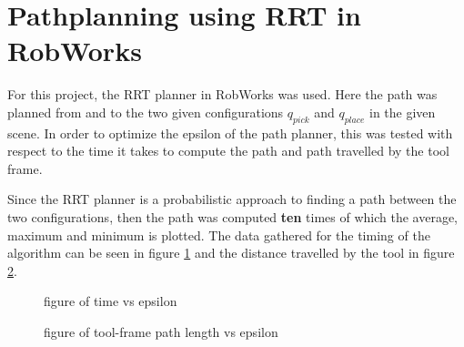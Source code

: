 \documentclass[12pt,a4paper]{article}
\begin{document}
\section{Pathplanning using RRT in RobWorks}
For this project, the RRT planner in RobWorks was used.
Here the path was planned from and to the two given configurations $q_{pick}$ and $q_{place}$ in the given scene.
In order to optimize the epsilon of the path planner, this was tested with respect to the time it takes to compute the path and path travelled by the tool frame.

Since the RRT planner is a probabilistic approach to finding a path between the two configurations, then the path was computed \textbf{ten} times of which the average, maximum and minimum is plotted.
The data gathered for the timing of the algorithm can be seen in figure \ref{fig:timeVSepsilon} and the distance travelled by the tool in figure \ref{fig:distVSepsilon}.


\begin{figure}[H]
\caption{figure of time vs epsilon}
\label{fig:timeVSepsilon}
\end{figure}


\begin{figure}[H]
\caption{figure of tool-frame path length vs epsilon}
\label{fig:distVSepsilon}
\end{figure}
\end{document}
